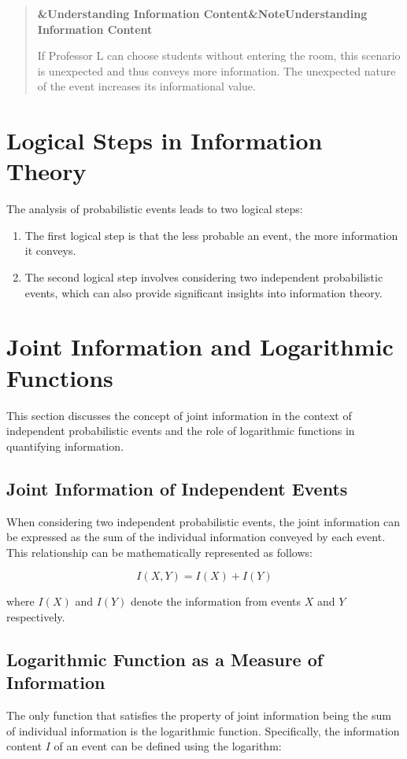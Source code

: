 \documentclass[a4paper]{article}
\newcommand{\boxheading}[1]{%
  \par\smallskip
  \noindent\textbf{\ifx&#1&Note\else#1\fi}\par
  \smallskip
}
\newenvironment{exbox}[1][]{%
  \begin{quote}\color{brown!70!black}\boxheading{#1}\normalcolor
}{\end{quote}}
\begin{document}
\begin{exbox}[Understanding Information Content]
If Professor L can choose students without entering the room, this scenario is unexpected and thus conveys more information. The unexpected nature of the event increases its informational value.
\end{exbox}

\section{Logical Steps in Information Theory}
The analysis of probabilistic events leads to two logical steps:

\begin{enumerate}
    \item The first logical step is that the less probable an event, the more information it conveys.
    \item The second logical step involves considering two independent probabilistic events, which can also provide significant insights into information theory.
\end{enumerate}

\section{Joint Information and Logarithmic Functions}
This section discusses the concept of joint information in the context of independent probabilistic events and the role of logarithmic functions in quantifying information.

\subsection{Joint Information of Independent Events}
When considering two independent probabilistic events, the joint information can be expressed as the sum of the individual information conveyed by each event. This relationship can be mathematically represented as follows:

\begin{equation}
I(X, Y) = I(X) + I(Y)
\end{equation}

where \(I(X)\) and \(I(Y)\) denote the information from events \(X\) and \(Y\) respectively.

\subsection{Logarithmic Function as a Measure of Information}
The only function that satisfies the property of joint information being the sum of individual information is the logarithmic function. Specifically, the information content \(I\) of an event can be defined using the logarithm:
\end{document}

